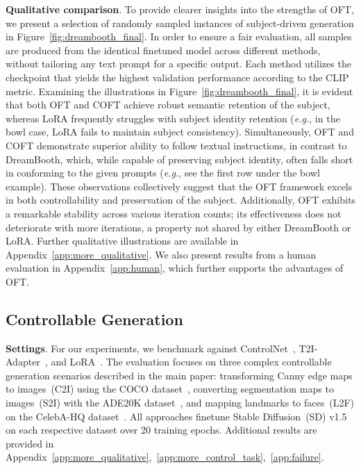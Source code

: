 \textbf{Qualitative comparison}. To provide clearer insights into the strengths of OFT, we present a selection of randomly sampled instances of subject-driven generation in Figure~\ref{fig:dreambooth_final}. In order to ensure a fair evaluation, all samples are produced from the identical finetuned model across different methods, without tailoring any text prompt for a specific output. Each method utilizes the checkpoint that yields the highest validation performance according to the CLIP metric. Examining the illustrations in Figure~\ref{fig:dreambooth_final}, it is evident that both OFT and COFT achieve robust semantic retention of the subject, whereas LoRA frequently struggles with subject identity retention (\emph{e.g.}, in the bowl case, LoRA fails to maintain subject consistency). Simultaneously, OFT and COFT demonstrate superior ability to follow textual instructions, in contrast to DreamBooth, which, while capable of preserving subject identity, often falls short in conforming to the given prompts (\emph{e.g.}, see the first row under the bowl example). These observations collectively suggest that the OFT framework excels in both controllability and preservation of the subject. Additionally, OFT exhibits a remarkable stability across various iteration counts; its effectiveness does not deteriorate with more iterations, a property not shared by either DreamBooth or LoRA. Further qualitative illustrations are available in Appendix~\ref{app:more_qualitative}. We also present results from a human evaluation in Appendix~\ref{app:human}, which further supports the advantages of OFT.

\subsection{Controllable Generation}

\textbf{Settings}. For our experiments, we benchmark against ControlNet~\cite{zhang2023adding}, T2I-Adapter~\cite{mou2023t2i}, and LoRA~\cite{hulora2022}. The evaluation focuses on three complex controllable generation scenarios described in the main paper: transforming Canny edge maps to images~(C2I) using the COCO dataset~\cite{lin2014microsoft}, converting segmentation maps to images~(S2I) with the ADE20K dataset~\cite{zhou2017scene}, and mapping landmarks to faces~(L2F) on the CelebA-HQ dataset~\cite{karras2018progressive,xia2021tedigan}. All approaches finetune Stable Diffusion~(SD) v1.5 on each respective dataset over 20 training epochs. Additional results are provided in Appendix~\ref{app:more_qualitative},~\ref{app:more_control_task},~\ref{app:failure}.

